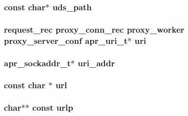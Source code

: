 \subsubsection[{\texorpdfstring{uds\+\_\+path}{uds_path}}]{\setlength{\rightskip}{0pt plus 5cm}const char$\ast$ uds\+\_\+path}\hypertarget{group__MOD__PROXY_ga46b82947aff7f666d626b556a8378392}{}\label{group__MOD__PROXY_ga46b82947aff7f666d626b556a8378392}
\subsubsection[{\texorpdfstring{uri}{uri}}]{ {\bf request\+\_\+rec} {\bf proxy\+\_\+conn\+\_\+rec} {\bf proxy\+\_\+worker} {\bf proxy\+\_\+server\+\_\+conf} {\bf apr\+\_\+uri\+\_\+t}$\ast$ uri}\hypertarget{group__MOD__PROXY_gabc22c03ae1feb0b4ea1efdd3eef4c964}{}\label{group__MOD__PROXY_gabc22c03ae1feb0b4ea1efdd3eef4c964}
\subsubsection[{\texorpdfstring{uri\+\_\+addr}{uri_addr}}]{ {\bf apr\+\_\+sockaddr\+\_\+t}$\ast$ uri\+\_\+addr}\hypertarget{group__MOD__PROXY_ga9eb39b5a7ddf76ee0a5f645b3237ed01}{}\label{group__MOD__PROXY_ga9eb39b5a7ddf76ee0a5f645b3237ed01}
\subsubsection[{\texorpdfstring{url}{url}}]{\setlength{\rightskip}{0pt plus 5cm}const char $\ast$ url}\hypertarget{group__MOD__PROXY_ga05d2db9f2dd75d18170f192bd1cc9b4e}{}\label{group__MOD__PROXY_ga05d2db9f2dd75d18170f192bd1cc9b4e}
\subsubsection[{\texorpdfstring{urlp}{urlp}}]{\setlength{\rightskip}{0pt plus 5cm}char$\ast$$\ast$ const urlp}\hypertarget{group__MOD__PROXY_ga974d9b4d643e6776a5a12061b88b3ae3}{}\label{group__MOD__PROXY_ga974d9b4d643e6776a5a12061b88b3ae3}
